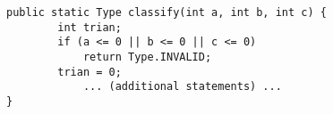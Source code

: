 \begin{lstlisting}
public static Type classify(int a, int b, int c) {
		int trian;
		if (a <= 0 || b <= 0 || c <= 0)
			return Type.INVALID;
		trian = 0;
	        ... (additional statements) ...
}
\end{lstlisting}
